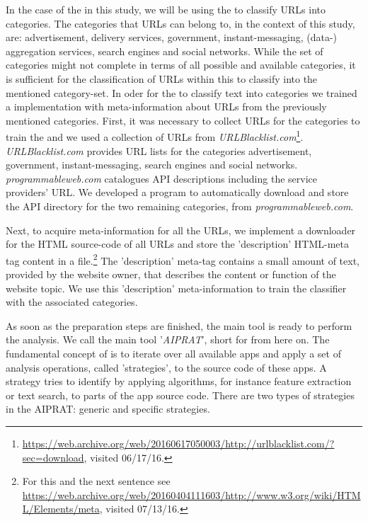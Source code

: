 In the case of the \sca in this study, we will be using the \nbc to classify URLs into categories.
The categories that URLs can belong to, in the context of this study, are: advertisement, delivery services, government, instant-messaging, (data-) aggregation services, search engines and social networks.
While the set of categories might not complete in terms of all possible and available categories, it is sufficient for the classification of URLs within this \sca to classify into the mentioned category-set.
In oder for the \nbc to classify text into categories we trained a \nbc implementation with meta-information about URLs from the previously mentioned categories.
First, it was necessary to collect URLs for the categories to train the \nbc and we used a collection of \acs{URL}s from \textit{URLBlacklist.com}\footnote{\url{https://web.archive.org/web/20160617050003/http://urlblacklist.com/?sec=download}, visited 06/17/16.}.
\textit{URLBlacklist.com} provides URL lists for the categories advertisement, government, instant-messaging, search engines and social networks.
\textit{programmableweb.com} catalogues API descriptions including the service providers' URL.
We developed a program to automatically download and store the API directory for the two remaining categories, from \textit{programmableweb.com}.

Next, to acquire meta-information for all the URLs, we implement a downloader for the HTML source-code of all URLs and store the 'description' HTML-meta tag content in a file.\footnote{For this and the next sentence see \url{https://web.archive.org/web/20160404111603/http://www.w3.org/wiki/HTML/Elements/meta}, visited 07/13/16.}
The 'description' meta-tag contains a small amount of text, provided by the website owner, that describes the content or function of the website topic.
We use this 'description' meta-information to train the classifier with the associated categories.\newline

As soon as the preparation steps are finished, the main \sca tool is ready to perform the \ipr analysis.
We call the main \sca tool '\textit{AIPRAT}', short for \aiprat from here on.
The fundamental concept of \AIPRAT is to iterate over all available apps and apply a set of analysis operations, called 'strategies', to the source code of these apps.
A strategy tries to identify \iprfs by applying algorithms, for instance feature extraction or text search, to parts of the app source code.
There are two types of strategies in the AIPRAT: generic and specific strategies.

